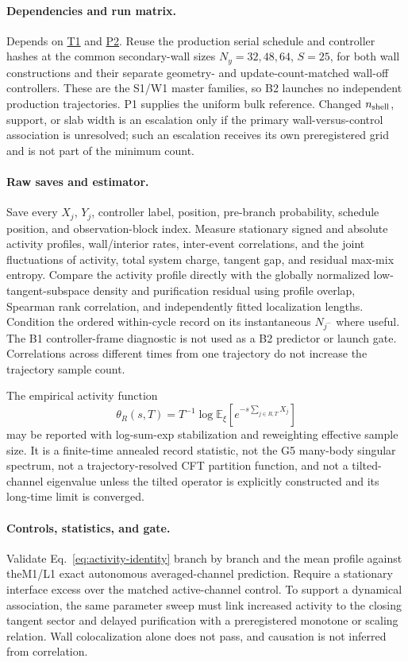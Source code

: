 \documentclass[aps,prx,twocolumn,floatfix,nofootinbib,superscriptaddress,longbibliography]{revtex4-2}
\newcommand{\E}{\mathbb{E}}
\newcommand{\campref}[1]{\hyperref[camp:#1]{#1}}
\begin{document}
\paragraph*{Dependencies and run matrix.}
Depends on \campref{T1} and \campref{P2}.  Reuse the production serial schedule and
controller hashes at the common secondary-wall sizes $N_y=32,48,64$, $S=25$, for both
wall constructions and their separate geometry- and update-count-matched wall-off
controllers.  These are the S1/W1 master families, so B2 launches no independent
production trajectories.  P1 supplies the uniform bulk reference.  Changed
$n_{\rm shell}$, support, or slab width is an escalation only if the primary
wall-versus-control association is unresolved; such an escalation receives its own
preregistered grid and is not part of the minimum count.

\paragraph*{Raw saves and estimator.}
Save every $X_j$, $Y_j$, controller label, position, pre-branch probability, schedule
position, and observation-block index.  Measure stationary signed and absolute activity
profiles, wall/interior rates, inter-event correlations, and the joint fluctuations of
activity, total system charge, tangent gap, and residual max-mix entropy.  Compare the
activity profile directly with the globally normalized low-tangent-subspace density and
purification residual using profile overlap, Spearman rank correlation, and independently
fitted localization lengths.  Condition the ordered within-cycle record on its
instantaneous $N_{j^-}$ where useful.  The B1 controller-frame diagnostic is not used as a
B2 predictor or launch gate.  Correlations across
different times from one trajectory do not increase the trajectory sample count.

The empirical activity function
\begin{equation}
 \theta_R(s,T)=T^{-1}\log\E_\xi[e^{-s\sum_{j\in R,T}X_j}]
\end{equation}
may be reported with log-sum-exp stabilization and reweighting effective sample size.  It
is a finite-time annealed record statistic, not the G5 many-body singular spectrum, not a
trajectory-resolved CFT partition function, and not a tilted-channel eigenvalue unless the
tilted operator is explicitly constructed and its long-time limit is converged.

\paragraph*{Controls, statistics, and gate.}\mbox{}\linebreak
Validate Eq.~\eqref{eq:activity-identity} branch by branch and the mean profile against the\linebreak[1]
M1/L1 exact autonomous averaged-channel prediction.  Require a stationary interface excess over the
matched active-channel control.  To support a dynamical association, the same parameter
sweep must link increased activity to the closing tangent sector and delayed purification
with a preregistered monotone or scaling relation.  Wall colocalization alone does not
pass, and causation is not inferred from correlation.
\end{document}
